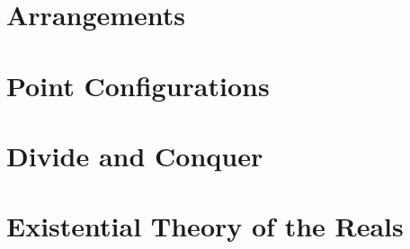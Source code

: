
\chapter{Arrangements}


\chapter{Point Configurations}


\chapter{Divide and Conquer}


\chapter{Existential Theory of the Reals}




